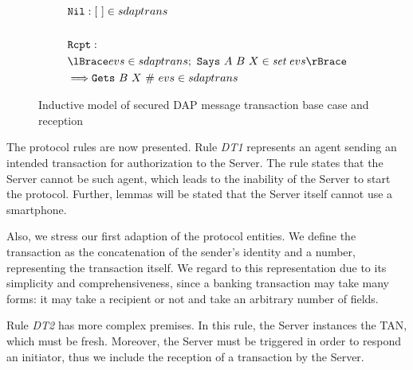 \begin{figure}
  \begin{align*}
    & \texttt{Nil}: [ \ ] \in sdaptrans \\
    & \\
    & \texttt{Rcpt}: \newline \\
    & \lBrace evs \in sdaptrans;\ \texttt{Says} \ A \ B \ X \in \textit{set}\ evs \rBrace \\
    & \Longrightarrow \texttt{Gets} \ B \ X \ \#\ evs \in sdaptrans
  \end{align*}
  \label{fig:dap-model-0}
  \caption{Inductive model of secured DAP message transaction base case and reception}
\end{figure}

The protocol rules are now presented. Rule \textit{DT1} represents an agent sending an intended transaction for authorization to the Server. The rule states that the Server cannot be such agent, which leads to the inability of the Server to start the protocol. Further, lemmas will be stated that the Server itself cannot use a smartphone.

Also, we stress our first adaption of the protocol entities. We define the transaction as the concatenation of the sender's identity and a number, representing the transaction itself. We regard to this representation due to its simplicity and comprehensiveness, since a banking transaction may take many forms: it may take a recipient or not and take an arbitrary number of fields.

Rule \textit{DT2} has more complex premises. In this rule, the Server instances the TAN, which must be fresh. Moreover, the Server must be triggered in order to respond an initiator, thus we include the reception of a transaction by the Server. 

